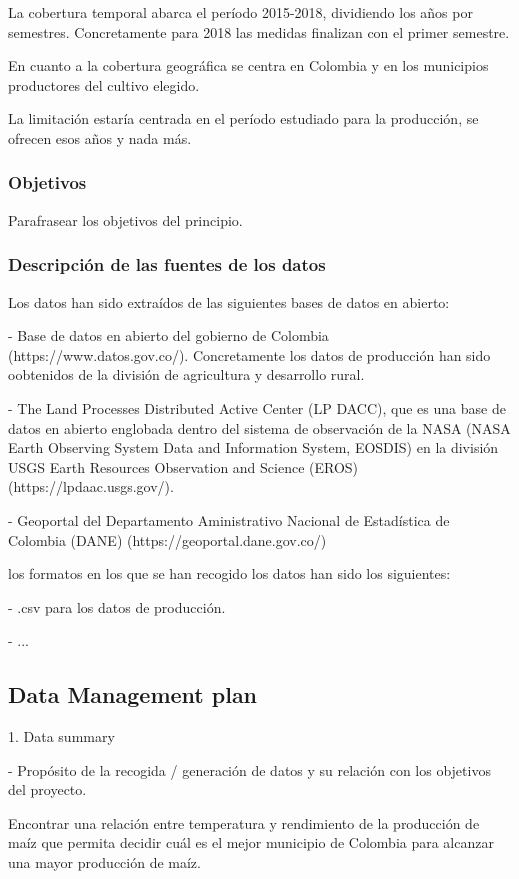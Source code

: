 \documentclass[12pt, spanish]{article}
\begin{document}
La cobertura temporal abarca el período 2015-2018, dividiendo los años por   semestres. Concretamente para 2018 las medidas finalizan con el primer semestre.

En cuanto a la cobertura geográfica se centra en Colombia y en los municipios productores del cultivo elegido.

La limitación estaría centrada en el período estudiado para la producción, se ofrecen esos años y nada más.

\subsubsection{Objetivos}

Parafrasear los objetivos del principio.

\subsubsection{Descripción de las fuentes de los datos}

Los datos han sido extraídos de las siguientes bases de datos en abierto: 

- Base de datos en abierto del gobierno de Colombia (https://www.datos.gov.co/). Concretamente los datos de producción han sido oobtenidos de la división de agricultura y desarrollo rural.

- The Land Processes Distributed Active Center (LP DACC), que es una base de datos en abierto englobada dentro del sistema de observación de la NASA (NASA Earth Observing System Data and Information System, EOSDIS) en la división USGS Earth Resources Observation and Science (EROS) (https://lpdaac.usgs.gov/).

- Geoportal del Departamento Aministrativo Nacional de Estadística de Colombia (DANE) (https://geoportal.dane.gov.co/)

los formatos en los que se han recogido los datos han sido los siguientes:

- .csv para los datos de producción.

- ...

\subsection{Data Management plan}

1. Data summary

- Propósito de la recogida / generación de datos y su relación con los objetivos del proyecto.

Encontrar una relación entre temperatura y rendimiento de la producción de maíz que permita decidir cuál es el mejor municipio de Colombia para alcanzar una mayor producción de maíz.
\end{document}
